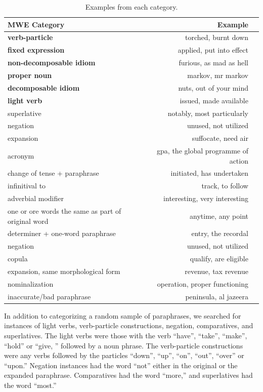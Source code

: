\documentclass[11pt]{article}
\begin{document}
\begin{table}[h]
\begin{center}
\begin{tabular}{|l|rl|}
\hline \bf MWE Category & \bf Example & \\ \hline
\bf verb-particle & torched, burnt down  &\\
\bf fixed expression & applied, put into effect &\\
\bf non-decomposable idiom & furious, as mad as hell &\\
\bf proper noun & markov, mr markov &\\
\bf decomposable idiom & nuts, out of your mind &\\
\bf light verb & issued, made available  &\\
superlative & notably, most particularly &\\
negation & unused, not utilized &\\
expansion & suffocate, need air &\\
acronym & gpa, the global programme of action &\\
change of tense + paraphrase & initiated, has undertaken &\\
infinitival to & track, to follow &\\
adverbial modifier& interesting, very interesting &\\
one or ore words the same as part of original word & anytime, any point &\\
determiner + one-word paraphrase & entry, the recordal &\\
negation & unused, not utilized &\\
copula & qualify, are eligible &\\
expansion, same morphological form & revenue, tax revenue &\\
nominalization & operation, proper functioning &\\
inaccurate/bad paraphrase & peninsula, al jazeera &\\
\hline
\end{tabular}
\end{center}
\caption{\label{font-table} Examples from each category. }
\end{table}

In addition to categorizing a random sample of paraphrases, we searched for instances of light verbs, verb-particle constructions, negation, comparatives, and superlatives. The light verbs were those with the verb “have”, “take”, “make”, “hold” or “give, ” followed by a noun phrase. The verb-particle constructions were any verbs followed by the particles “down”, “up”, “on”, “out”, “over” or “upon.” Negation instances had the word “not” either in the original or the expanded paraphrase. Comparatives had the word “more,” and superlatives had the word “most.”
\end{document}
